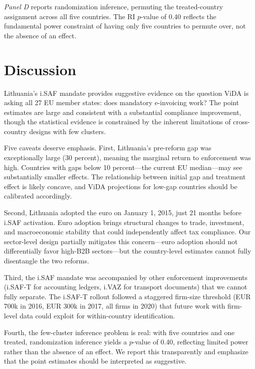 \documentclass[12pt]{article}
\begin{document}
\textit{Panel D} reports randomization inference, permuting the treated-country assignment across all five countries. The RI $p$-value of 0.40 reflects the fundamental power constraint of having only five countries to permute over, not the absence of an effect.

\section{Discussion}

Lithuania's i.SAF mandate provides suggestive evidence on the question ViDA is asking all 27 EU member states: does mandatory e-invoicing work? The point estimates are large and consistent with a substantial compliance improvement, though the statistical evidence is constrained by the inherent limitations of cross-country designs with few clusters.

Five caveats deserve emphasis. First, Lithuania's pre-reform gap was exceptionally large (30 percent), meaning the marginal return to enforcement was high. Countries with gaps below 10 percent---the current EU median---may see substantially smaller effects. The relationship between initial gap and treatment effect is likely concave, and ViDA projections for low-gap countries should be calibrated accordingly.

Second, Lithuania adopted the euro on January 1, 2015, just 21 months before i.SAF activation. Euro adoption brings structural changes to trade, investment, and macroeconomic stability that could independently affect tax compliance. Our sector-level design partially mitigates this concern---euro adoption should not differentially favor high-B2B sectors---but the country-level estimates cannot fully disentangle the two reforms.

Third, the i.SAF mandate was accompanied by other enforcement improvements (i.SAF-T for accounting ledgers, i.VAZ for transport documents) that we cannot fully separate. The i.SAF-T rollout followed a staggered firm-size threshold (EUR 700k in 2016, EUR 300k in 2017, all firms in 2020) that future work with firm-level data could exploit for within-country identification.

Fourth, the few-cluster inference problem is real: with five countries and one treated, randomization inference yields a $p$-value of 0.40, reflecting limited power rather than the absence of an effect. We report this transparently and emphasize that the point estimates should be interpreted as suggestive.
\end{document}
